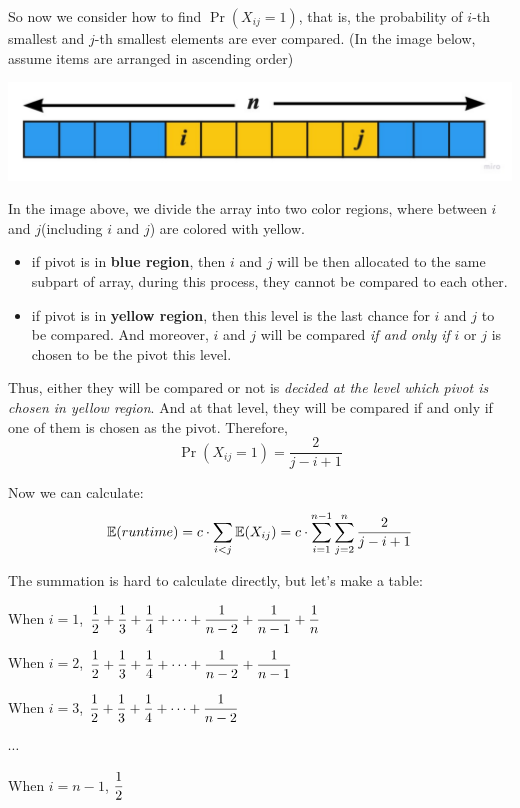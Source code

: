 \begin{spacing}{1.3}
    So now we consider how to find $\Pr(X_{ij}=1)$, that is, 
    the probability of $i$-th smallest and $j$-th smallest 
    elements are ever compared. 
    (In the image below, assume items are arranged in 
    ascending order)
    \begin{center}
        \includegraphics[scale=0.3]{images/03-quicksort-exp.pdf}
    \end{center}
    In the image above, we divide the array into two color regions,
    where between $i$ and $j$(including $i$ and $j$) are colored 
    with yellow.
    \begin{itemize}
        \item if pivot is in {\bf blue region}, then $i$ and $j$
        will be then allocated to the same subpart of array,
        during this process, they cannot be compared to each other.
        \item if pivot is in {\bf yellow region}, then this 
        level is the last chance for $i$ and $j$ to be compared.
        And moreover, $i$ and $j$ will be compared {\it if and 
        only if} $i$ or $j$ is chosen to be the pivot this level.
    \end{itemize}
    Thus, either they will be compared or not is {\it decided 
    at the level which pivot is chosen in yellow region}.
    And at that level, they will be compared if and only if 
    one of them is chosen as the pivot. Therefore,
    $$\Pr(X_{ij}=1)=\frac{2}{j-i+1}$$

    Now we can calculate:
    $$\mathbb{E}(runtime)=c\cdot \sum_{i<j}\mathbb{E}(X_{ij})=c\cdot 
    \sum_{i=1}^{n-1}\sum_{j=2}^{n} \frac{2}{j-i+1}$$

    The summation is hard to calculate directly, but let's make a table: 

    When $i=1$, $\displaystyle \frac{1}{2}+\frac{1}{3}+\frac{1}{4}+
    \cdots+\frac{1}{n-2}+\frac{1}{n-1}+\frac{1}{n}$

    When $i=2$, $\displaystyle \frac{1}{2}+\frac{1}{3}+\frac{1}{4}+
    \cdots+\frac{1}{n-2}+\frac{1}{n-1}$

    When $i=3$, $\displaystyle \frac{1}{2}+\frac{1}{3}+\frac{1}{4}+
    \cdots+\frac{1}{n-2}$

    $\cdots$

    When $i=n-1$, $\displaystyle \frac{1}{2}$


\end{spacing}
